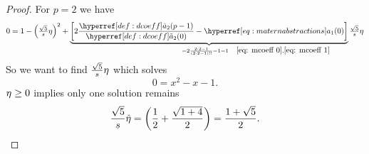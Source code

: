 \begin{proof}
	For \(p=2\) we have
	\begin{equation*}
		0 = 1 - \left(\tfrac{\sqrt{5}}{s}\lr\right)^2
		+ \underbrace{\biggl[2\frac{\dcoeff[2](p-1)}{\dcoeff[2](0)} - \mcoeff[1](0)\biggr]}_{
			= 2\frac{2\cdot 2-1}{(2\cdot 2 -1)!!} - 1
			=1\quad \mathrlap{\eqref{eq: mcoeff 0}, \eqref{eq: mcoeff 1}}
		}\tfrac{\sqrt{5}}{s}\lr
	\end{equation*}
	So we want to find \(\tfrac{\sqrt{5}}{s}\eta\) which solves
	\begin{equation*}
		0 = x^2 - x - 1.
	\end{equation*}
	\(\eta\ge0\) implies only one solution remains
	\begin{equation*}
		\frac{\sqrt{5}}{s}\hat{\eta}
		= \left(\frac12 + \frac{\sqrt{1 + 4}}{2}\right)
		= \frac{1+\sqrt{5}}2.
		\qedhere
	\end{equation*}
\end{proof}

